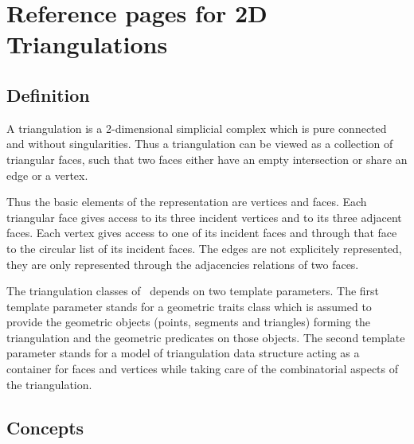 
\clearpage
\section{Reference pages for 2D Triangulations}

\subsection*{Definition}
A triangulation is a 2-dimensional simplicial complex which is pure
connected and without singularities. Thus a triangulation
can be viewed as a collection of triangular faces,
such that two faces either have an empty intersection or share an edge or a vertex.

Thus the basic elements of the representation are vertices and faces.
Each triangular face gives access to its three incident vertices 
and to its three adjacent faces. 
Each vertex gives access to one of its incident faces
and through that face to the circular list of its incident faces.
The edges are not explicitely represented, they are only represented 
through the adjacencies relations of two faces.

The triangulation classes of \cgal\ depends on two template parameters.
The first template parameter stands for
 a geometric traits class which is assumed to provide
the geometric objects (points, segments and triangles) 
forming  the triangulation and the geometric predicates on those objects.
The second template parameter stands for a model
of  triangulation data
structure acting as a container for faces and vertices
while  taking care of the combinatorial aspects of the triangulation. 



\subsection*{Concepts}
 \\
 \\
 \\

